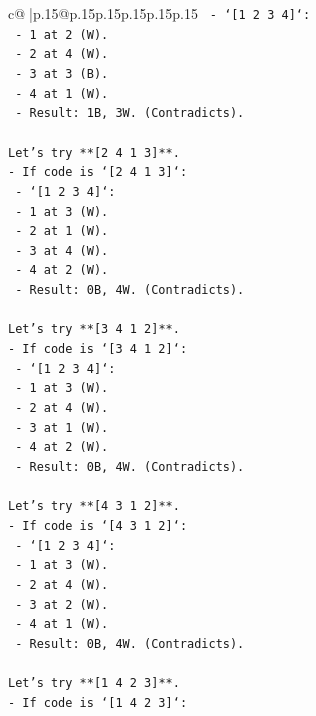 \documentclass{article}
\begin{document}
{\begin{supertabular}{c@{$\;$}|p{.15\linewidth}@{}p{.15\linewidth}p{.15\linewidth}p{.15\linewidth}p{.15\linewidth}p{.15\linewidth}}
{{{\texttt{  {-} `{[}1 2 3 4{]}`:} \\
\texttt{    {-} 1 at 2 (W).} \\
\texttt{    {-} 2 at 4 (W).} \\
\texttt{    {-} 3 at 3 (B).} \\
\texttt{    {-} 4 at 1 (W).} \\
\texttt{    {-} Result: 1B, 3W. (Contradicts).} \\
\\ 
\texttt{Let's try **{[}2 4 1 3{]}**.} \\
\texttt{{-} If code is `{[}2 4 1 3{]}`:} \\
\texttt{  {-} `{[}1 2 3 4{]}`:} \\
\texttt{    {-} 1 at 3 (W).} \\
\texttt{    {-} 2 at 1 (W).} \\
\texttt{    {-} 3 at 4 (W).} \\
\texttt{    {-} 4 at 2 (W).} \\
\texttt{    {-} Result: 0B, 4W. (Contradicts).} \\
\\ 
\texttt{Let's try **{[}3 4 1 2{]}**.} \\
\texttt{{-} If code is `{[}3 4 1 2{]}`:} \\
\texttt{  {-} `{[}1 2 3 4{]}`:} \\
\texttt{    {-} 1 at 3 (W).} \\
\texttt{    {-} 2 at 4 (W).} \\
\texttt{    {-} 3 at 1 (W).} \\
\texttt{    {-} 4 at 2 (W).} \\
\texttt{    {-} Result: 0B, 4W. (Contradicts).} \\
\\ 
\texttt{Let's try **{[}4 3 1 2{]}**.} \\
\texttt{{-} If code is `{[}4 3 1 2{]}`:} \\
\texttt{  {-} `{[}1 2 3 4{]}`:} \\
\texttt{    {-} 1 at 3 (W).} \\
\texttt{    {-} 2 at 4 (W).} \\
\texttt{    {-} 3 at 2 (W).} \\
\texttt{    {-} 4 at 1 (W).} \\
\texttt{    {-} Result: 0B, 4W. (Contradicts).} \\
\\ 
\texttt{Let's try **{[}1 4 2 3{]}**.} \\
\texttt{{-} If code is `{[}1 4 2 3{]}`:} \\
}}}
\end{supertabular}}
\end{document}
